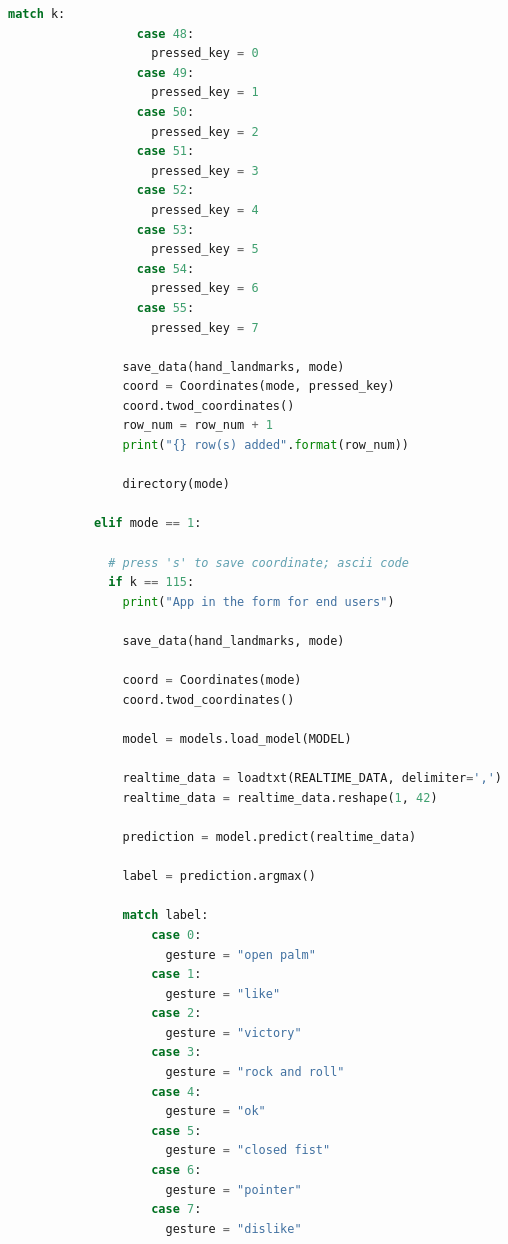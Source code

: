 \documentclass[master]{finthesis}
\begin{document}
\begin{lstlisting}[language=Python, caption={Имплементација система за препознавање гестикулација.}, label={lst:py:main.py}]
                match k:
                  case 48:
                    pressed_key = 0
                  case 49:
                    pressed_key = 1
                  case 50:
                    pressed_key = 2
                  case 51:
                    pressed_key = 3
                  case 52:
                    pressed_key = 4
                  case 53:
                    pressed_key = 5
                  case 54:
                    pressed_key = 6
                  case 55:
                    pressed_key = 7
                    
                save_data(hand_landmarks, mode)
                coord = Coordinates(mode, pressed_key)
                coord.twod_coordinates()
                row_num = row_num + 1
                print("{} row(s) added".format(row_num))
                
                directory(mode)
            
            elif mode == 1: 
              
              # press 's' to save coordinate; ascii code 
              if k == 115:
                print("App in the form for end users")
                
                save_data(hand_landmarks, mode)
                
                coord = Coordinates(mode)
                coord.twod_coordinates()
                
                model = models.load_model(MODEL)
                
                realtime_data = loadtxt(REALTIME_DATA, delimiter=',')
                realtime_data = realtime_data.reshape(1, 42)
                              
                prediction = model.predict(realtime_data)
                
                label = prediction.argmax()
                
                match label:
                    case 0:
                      gesture = "open palm" 
                    case 1:
                      gesture = "like"
                    case 2:
                      gesture = "victory"
                    case 3:
                      gesture = "rock and roll"
                    case 4:
                      gesture = "ok"
                    case 5:
                      gesture = "closed fist"
                    case 6:
                      gesture = "pointer"
                    case 7:
                      gesture = "dislike"
                

\end{lstlisting}
\end{document}
